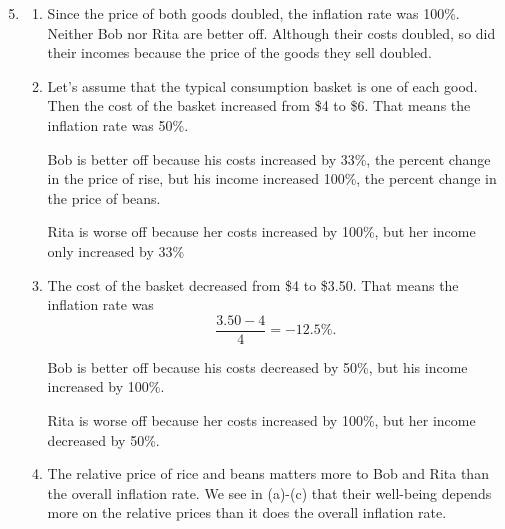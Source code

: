 \documentclass{article}
\begin{document}
\begin{enumerate}

\setcounter{enumi}{4}

\item

	\begin{enumerate}
	
	\item Since the price of both goods doubled, the inflation rate was 100\%. Neither Bob nor Rita are better off. Although their costs doubled, so did their incomes because the price of the goods they sell doubled.
	
	\item Let's assume that the typical consumption basket is one of each good. Then the cost of the basket increased from \$4 to \$6. That means the inflation rate was 50\%.
	
	Bob is better off because his costs increased by 33\%, the percent change in the price of rise, but his income increased 100\%, the percent change in the price of beans.
	
	Rita is worse off because her costs increased by 100\%, but her income only increased by 33\%
	
	\item The cost of the basket decreased from \$4 to \$3.50. That means the inflation rate was
		\[ \frac{3.50 - 4}{4} = -12.5\%. \]
		
		Bob is better off because his costs decreased by 50\%, but his income increased by 100\%. 
		
		Rita is worse off because her costs increased by 100\%, but her income decreased by 50\%. 
		
	\item The relative price of rice and beans matters more to Bob and Rita than the overall inflation rate. We see in (a)-(c) that their well-being depends more on the relative prices than it does the overall inflation rate.
	
	\end{enumerate}

\end{enumerate}
\end{document}
